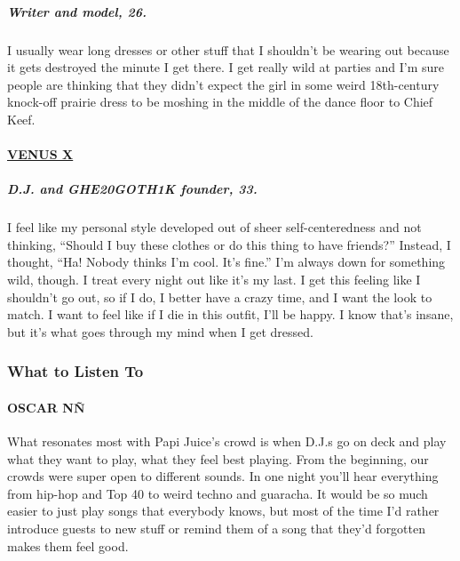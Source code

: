 \hypertarget{writer-and-model-26}{%
\subparagraph{\texorpdfstring{\textbf{Writer and model,
26.}}{Writer and model, 26.}}\label{writer-and-model-26}}

I usually wear long dresses or other stuff that I shouldn't be wearing
out because it gets destroyed the minute I get there. I get really wild
at parties and I'm sure people are thinking that they didn't expect the
girl in some weird 18th-century knock-off prairie dress to be moshing in
the middle of the dance floor to Chief Keef.

\hypertarget{venus-x}{%
\paragraph{\texorpdfstring{\href{https://www.instagram.com/venusx/?hl=en}{VENUS
X}}{VENUS X}}\label{venus-x}}

\hypertarget{dj-and-ghe20goth1k-founder-33}{%
\subparagraph{\texorpdfstring{\textbf{D.J. and GHE20GOTH1K founder,
33.}}{D.J. and GHE20GOTH1K founder, 33.}}\label{dj-and-ghe20goth1k-founder-33}}

I feel like my personal style developed out of sheer self-centeredness
and not thinking, ``Should I buy these clothes or do this thing to have
friends?'' Instead, I thought, ``Ha! Nobody thinks I'm cool. It's
fine.'' I'm always down for something wild, though. I treat every night
out like it's my last. I get this feeling like I shouldn't go out, so if
I do, I better have a crazy time, and I want the look to match. I want
to feel like if I die in this outfit, I'll be happy. I know that's
insane, but it's what goes through my mind when I get dressed.

\hypertarget{what-to-listen-to}{%
\subsubsection{What to Listen To}\label{what-to-listen-to}}

\hypertarget{oscar-nuxf1-1}{%
\paragraph{OSCAR NÑ}\label{oscar-nuxf1-1}}

What resonates most with Papi Juice's crowd is when D.J.s go on deck and
play what they want to play, what they feel best playing. From the
beginning, our crowds were super open to different sounds. In one night
you'll hear everything from hip-hop and Top 40 to weird techno and
guaracha. It would be so much easier to just play songs that everybody
knows, but most of the time I'd rather introduce guests to new stuff or
remind them of a song that they'd forgotten makes them feel good.

